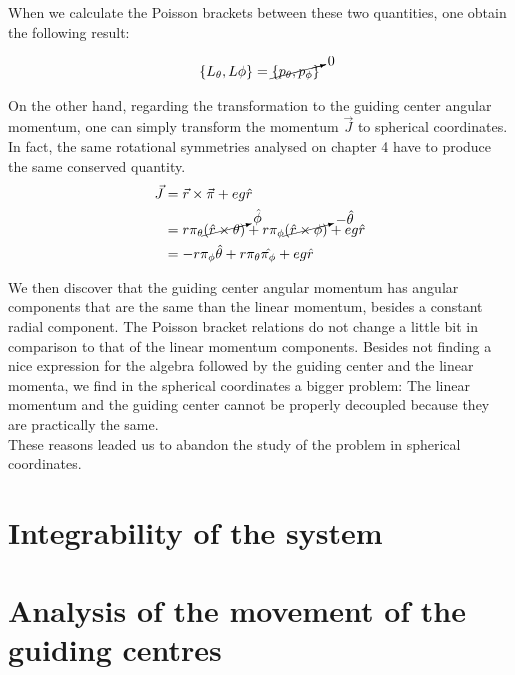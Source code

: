 When we calculate the Poisson brackets between these two quantities, one obtain the following result:

\begin{align*}
\left\lbrace L_\theta, L\phi \right\rbrace = \cancelto{0}{\left\lbrace p_\theta, p_\phi \right\rbrace}
\end{align*}

On the other hand, regarding the transformation to the guiding center angular momentum, one can simply transform the momentum $\vec{J}$ to spherical coordinates. In fact, the same rotational symmetries analysed on chapter 4 have to produce the same conserved quantity.\\

\begin{align*}
\vec{J} &= \vec{r}\times\vec{\pi} + eg\hat{r}\\
&= r\pi_\theta \cancelto{\hat{\phi}}{(\hat{r}\times \theta)} + r\pi_\phi \cancelto{-\hat{\theta}}{(\hat{r}\times \phi)} + eg\hat{r}\\
&= -r\pi_\phi \hat{\theta} + r\pi_\theta \hat{\pi_\phi} + eg\hat{r}
\end{align*}

We then discover that the guiding center angular momentum has angular components that are the same than the linear momentum, besides a constant radial component. The Poisson bracket relations do not change a little bit in comparison to that of the linear momentum components. Besides not finding a nice expression for the algebra followed by the guiding center and the linear momenta, we find in the spherical coordinates a bigger problem: The linear momentum and the guiding center cannot be properly decoupled because they are practically the same.\\

These reasons leaded us to abandon the study of the problem in spherical coordinates.\\


\section{Integrability of the system}


\section{Analysis of the movement of the guiding centres}



